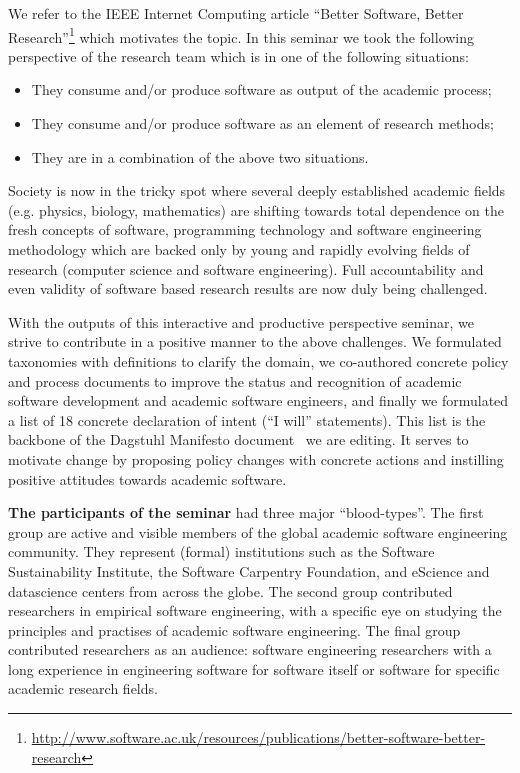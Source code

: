 \documentclass[a4paper,UKenglish]{dagrep}
\begin{document}
We refer to the IEEE Internet Computing article ``Better Software, Better Research''\footnote{\url{http://www.software.ac.uk/resources/publications/better-software-better-research}} which motivates the topic. In this seminar we took the following perspective of the research team which is in one of the following situations:
\begin{itemize}
\item They consume and/or produce software as output of the academic process;
\item They consume and/or produce software as an element of research methods;
\item They are in a combination of the above two situations.
\end{itemize}

Society is now in the tricky spot where several deeply established academic fields
(e.g. physics, biology, mathematics) are shifting towards total dependence on the fresh concepts of software, programming technology and software engineering methodology 
which are backed only by young and rapidly evolving fields of research (computer science and software engineering).  Full accountability and even validity of software based research results are now duly being challenged. 

With the outputs of this interactive and productive perspective seminar, we strive to contribute in a positive manner to the above challenges. We formulated taxonomies with definitions to clarify the domain, we co-authored concrete policy and process documents to improve the status and recognition of academic software development and academic software engineers, and finally we formulated a list of 18 concrete declaration of intent (``I will'' statements). This list is the backbone of the Dagstuhl Manifesto document~\cite{manifesto} we are editing. It serves to motivate change by  proposing policy changes with concrete actions and instilling positive attitudes towards academic software.
 

\textbf{The participants of the seminar} had three major ``blood-types''. The first group are active and visible members of the global academic software engineering community. They represent (formal) institutions such as the Software Sustainability Institute, the Software Carpentry Foundation, and eScience and datascience centers from across the globe. The second group contributed researchers in empirical software engineering, with a specific eye on studying the principles and practises of academic software engineering. The final group contributed researchers as an audience: software engineering researchers with a long experience in engineering software for software itself or software for specific academic research fields. 
\end{document}
